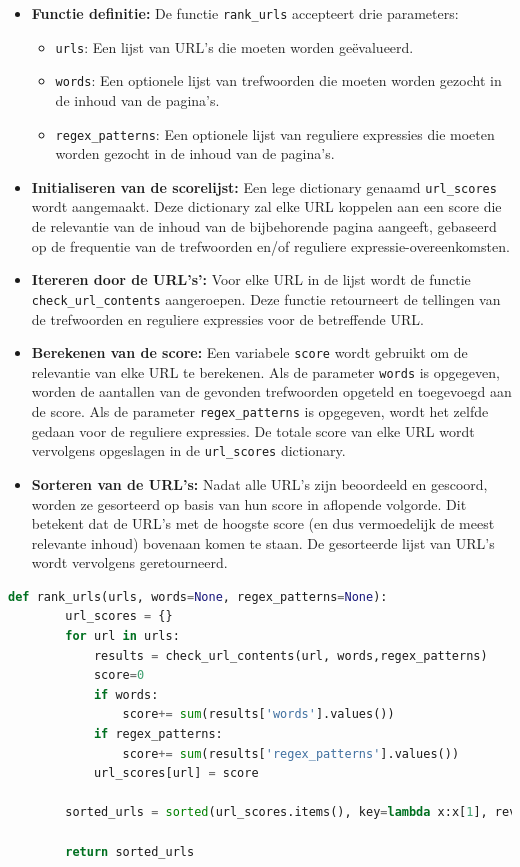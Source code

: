 \begin{itemize}
    \item \textbf{Functie definitie: }De functie \texttt{rank\_urls} accepteert drie parameters:
    \begin{itemize}
        \item \texttt{urls}: Een lijst van URL's die moeten worden geëvalueerd.
        \item \texttt{words}: Een optionele lijst van trefwoorden die moeten worden gezocht in de inhoud van de pagina's.
        \item \texttt{regex\_patterns}: Een optionele lijst van reguliere expressies die moeten worden gezocht in de inhoud van de pagina's.
    \end{itemize}
    \item \textbf{Initialiseren van de scorelijst: }Een lege dictionary genaamd \texttt{url\_scores} wordt aangemaakt. Deze dictionary zal elke URL koppelen aan een score die de relevantie van de inhoud van de bijbehorende pagina aangeeft, gebaseerd op de frequentie van de trefwoorden en/of reguliere expressie-overeenkomsten.
    \item \textbf{Itereren door de URL's': }Voor elke URL in de lijst wordt de functie \texttt{check\_url\_contents} aangeroepen. Deze functie retourneert de tellingen van de trefwoorden en reguliere expressies voor de betreffende URL.
    \item \textbf{Berekenen van de score: }Een variabele \texttt{score} wordt gebruikt om de relevantie van elke URL te berekenen. Als de parameter \texttt{words} is opgegeven, worden de aantallen van de gevonden trefwoorden opgeteld en toegevoegd aan de score. Als de parameter \texttt{regex\_patterns} is opgegeven, wordt het zelfde gedaan voor de reguliere expressies. De totale score van elke URL wordt vervolgens opgeslagen in de \texttt{url\_scores} dictionary.
    \item \textbf{Sorteren van de URL's: }Nadat alle URL's zijn beoordeeld en gescoord, worden ze gesorteerd op basis van hun score in aflopende volgorde. Dit betekent dat de URL's met de hoogste score (en dus vermoedelijk de meest relevante inhoud) bovenaan komen te staan. De gesorteerde lijst van URL's wordt vervolgens geretourneerd.
\end{itemize}
\begin{lstlisting}[language=python, captionpos=b, caption={Functie rank\_urls}, label={code:poc10}, float=h]
    def rank_urls(urls, words=None, regex_patterns=None):
        url_scores = {}
        for url in urls:
            results = check_url_contents(url, words,regex_patterns)
            score=0
            if words:
                score+= sum(results['words'].values())
            if regex_patterns:
                score+= sum(results['regex_patterns'].values())
            url_scores[url] = score

        sorted_urls = sorted(url_scores.items(), key=lambda x:x[1], reverse=True)

        return sorted_urls

\end{lstlisting}

